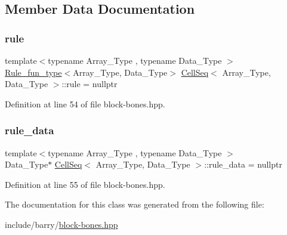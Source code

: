 \subsection{Member Data Documentation}
\mbox{\label{class_cell_seq_a96562d860b3e66a90330854ff9184ba5}} 
\subsubsection{\texorpdfstring{rule}{rule}}
{\footnotesize\ttfamily template$<$typename Array\+\_\+\+Type , typename Data\+\_\+\+Type $>$ \\
\hyperlink{typedefs_8hpp_a2e147c9c0e8b65be614c98a5dd400d5c}{Rule\+\_\+fun\+\_\+type}$<$Array\+\_\+\+Type, Data\+\_\+\+Type$>$ \hyperlink{class_cell_seq}{Cell\+Seq}$<$ Array\+\_\+\+Type, Data\+\_\+\+Type $>$\+::rule = nullptr\hspace{0.3cm}{\ttfamily [protected]}}



Definition at line 54 of file block-\/bones.\+hpp.

\mbox{\label{class_cell_seq_a543981f0422f690a3c52da29f82d8e0e}} 
\subsubsection{\texorpdfstring{rule\+\_\+data}{rule\_data}}
{\footnotesize\ttfamily template$<$typename Array\+\_\+\+Type , typename Data\+\_\+\+Type $>$ \\
Data\+\_\+\+Type$\ast$ \hyperlink{class_cell_seq}{Cell\+Seq}$<$ Array\+\_\+\+Type, Data\+\_\+\+Type $>$\+::rule\+\_\+data = nullptr\hspace{0.3cm}{\ttfamily [protected]}}



Definition at line 55 of file block-\/bones.\+hpp.



The documentation for this class was generated from the following file\+:\begin{DoxyCompactItemize}
\item 
include/barry/\hyperlink{block-bones_8hpp}{block-\/bones.\+hpp}\end{DoxyCompactItemize}
